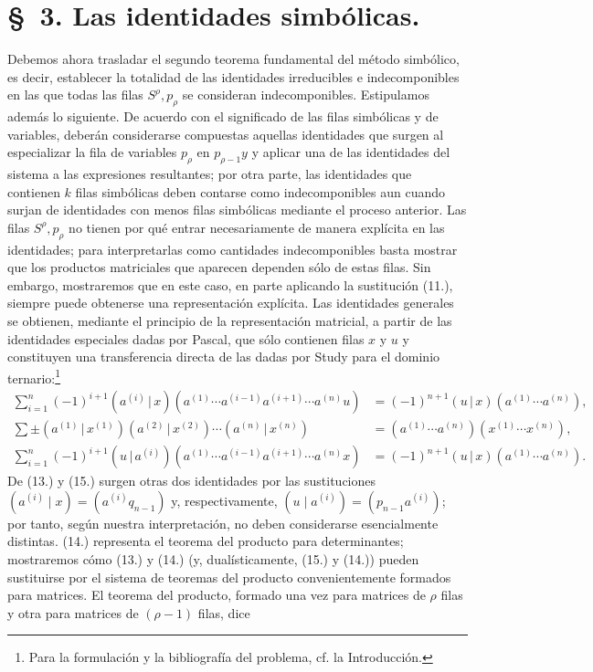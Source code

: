\documentclass[11pt]{article}
\newcommand{\pair}[2]{(#1\,|\,#2)}
\begin{document}
\section*{\S\ 3. Las identidades simbólicas.}
Debemos ahora trasladar el segundo teorema fundamental del método simbólico, es decir, establecer la totalidad de las identidades irreducibles e indecomponibles en las que todas las filas $S^\rho,p_\rho$ se consideran indecomponibles. Estipulamos además lo siguiente. De acuerdo con el significado de las filas simbólicas y de variables, deberán considerarse compuestas aquellas identidades que surgen al especializar la fila de variables $p_\rho$ en $p_{\rho-1}y$ y aplicar una de las identidades del sistema a las expresiones resultantes; por otra parte, las identidades que contienen $k$ filas simbólicas deben contarse como indecomponibles aun cuando surjan de identidades con menos filas simbólicas mediante el proceso anterior. Las filas $S^\rho,p_\rho$ no tienen por qué entrar necesariamente de manera explícita en las identidades; para interpretarlas como cantidades indecomponibles basta mostrar que los productos matriciales que aparecen dependen sólo de estas filas. Sin embargo, mostraremos que en este caso, en parte aplicando la sustitución (11.), siempre puede obtenerse una representación explícita. Las identidades generales se obtienen, mediante el principio de la representación matricial, a partir de las identidades especiales dadas por Pascal, que sólo contienen filas $x$ y $u$ y constituyen una transferencia directa de las dadas por Study para el dominio ternario:\footnote{Para la formulación y la bibliografía del problema, cf. la Introducción.}
\begin{align}
\sum_{i=1}^n(-1)^{i+1}\pair{a^{(i)}}{x}(a^{(1)}\cdots a^{(i-1)}a^{(i+1)}\cdots a^{(n)}u)&=(-1)^{n+1}\pair{u}{x}(a^{(1)}\cdots a^{(n)}),\tag{13}\\
\sum\pm\pair{a^{(1)}}{x^{(1)}}\pair{a^{(2)}}{x^{(2)}}\cdots\pair{a^{(n)}}{x^{(n)}}&=(a^{(1)}\cdots a^{(n)})(x^{(1)}\cdots x^{(n)}),\tag{14}\\
\sum_{i=1}^n(-1)^{i+1}\pair{u}{a^{(i)}}(a^{(1)}\cdots a^{(i-1)}a^{(i+1)}\cdots a^{(n)}x)&=(-1)^{n+1}\pair{u}{x}(a^{(1)}\cdots a^{(n)}).\tag{15}
\end{align}
De (13.) y (15.) surgen otras dos identidades por las sustituciones $(a^{(i)}\mid x)=(a^{(i)}q_{n-1})$ y, respectivamente, $(u\mid a^{(i)})=(p_{n-1}a^{(i)})$; por tanto, según nuestra interpretación, no deben considerarse esencialmente distintas. (14.) representa el teorema del producto para determinantes; mostraremos cómo (13.) y (14.) (y, dualísticamente, (15.) y (14.)) pueden sustituirse por el sistema de teoremas del producto convenientemente formados para matrices. El teorema del producto, formado una vez para matrices de $\rho$ filas y otra para matrices de $(\rho-1)$ filas, dice
\end{document}
